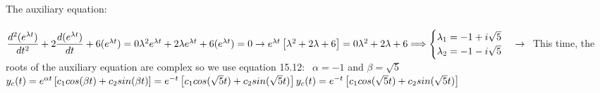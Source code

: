 \documentclass[fleqn]{article}
\begin{document}
\begin{enumerate}
\begin{enumerate}
          \textcolor{hwColor}{
            The auxiliary equation: \\
            \\
            $
              \dfrac{d^2 (e^{\lambda t})}{dt^2}+2\dfrac{d(e^{\lambda t})}{dt}+6(e^{\lambda t})=0 \\
              \\
              \lambda^2 e^{\lambda t}+2\lambda e^{\lambda t}+6(e^{\lambda t})=0 \rightarrow e^{\lambda t} \left[\lambda^2+2\lambda+6\right]=0 \\
              \\
              \lambda^2+2\lambda+6 \Longrightarrow \begin{cases}
                \lambda_1=-1+i\sqrt{5} \\
                \lambda_2=-1-i\sqrt{5}
              \end{cases} \rightarrow \\
            $
              This time, the roots of the auxiliary equation are complex so we use equation 15.12: $~~ \alpha=-1$ and $\beta=\sqrt{5}$ \\
            $ 
              y_c(t)=e^{\alpha t}\left[c_1 cos(\beta t)+c_2 sin(\beta t)\right]=e^{-t}\left[c_1 cos(\sqrt{5}t)+c_2 sin(\sqrt{5}t)\right] \\
              \\
              y_c(t)=e^{-t}\left[c_1 cos(\sqrt{5}t)+c_2 sin(\sqrt{5}t)\right]
            $
          }

          \bigbreak


\end{enumerate}
\end{enumerate}
\end{document}
